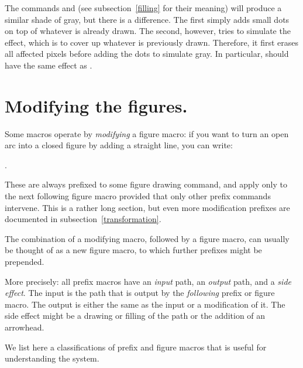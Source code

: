 \documentclass[letterpaper]{article}
\begin{document}
The commands  and  (see
subsection~\ref{filling} for their meaning) will produce a similar shade
of gray, but there is a difference. The first simply adds small dots on
top of whatever is already drawn. The second, however, tries to simulate
the \MP{} effect, which is to cover up whatever is previously drawn.
Therefore, it first erases all affected pixels before adding the dots to
simulate gray. In particular,  should have the
same effect as .


\section{Modifying the figures.}\label{modifier}

Some \mfp{} macros operate by \emph{modifying} a figure macro: if you
want to turn an open arc into a closed figure by adding a straight line,
you can write:
\begin{ex}
  .
\end{ex}
These are always prefixed to some figure drawing command, and apply only
to the next following figure macro provided that only other prefix
commands intervene. This is a rather long section, but even more
modification prefixes are documented in subsection~\ref{transformation}.

The combination of a modifying macro, followed by a figure macro, can
usually be thought of as a new figure macro, to which further prefixes
might be prepended.

More precisely: all prefix macros have an \emph{input} path, an
\emph{output} path, and a \emph{side effect}. The input is the path that
is output by the \emph{following} prefix or figure macro. The output is
either the same as the input or a modification of it. The side effect
might be a drawing or filling of the path or the addition of an
arrowhead.

We list here a classifications of prefix and figure macros that is
useful for understanding the \mfp{} system.
\end{document}
